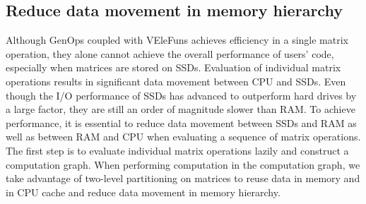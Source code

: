 

\subsection{Reduce data movement in memory hierarchy}
Although GenOps coupled with VEleFuns achieves efficiency in a single matrix
operation, they alone cannot achieve the overall performance of users' code,
especially when matrices are stored on SSDs. Evaluation of individual matrix
operations results in significant data movement between CPU and SSDs. Even
though the I/O performance of SSDs has advanced to outperform hard drives by
a large factor, they are still an order of magnitude slower than RAM.
To achieve performance, it is essential to reduce data movement between SSDs
and RAM as well as between RAM and CPU when evaluating a sequence
of matrix operations. The first step is to evaluate individual matrix operations
lazily and construct a computation graph. When performing computation in
the computation graph, we take advantage of two-level partitioning on matrices
to reuse data in memory and in CPU cache and reduce data movement in memory
hierarchy.

